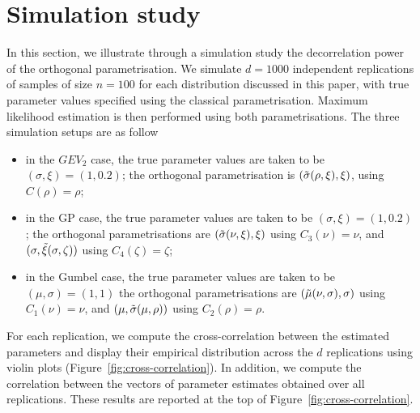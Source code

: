 \documentclass{article}
\newcommand{\1}{\mathds{1}}
\theoremstyle{definition}
\begin{document}
\section{Simulation study}\label{sec:simu}
In this section, we illustrate through a simulation study the decorrelation power of the orthogonal parametrisation. 
We simulate $d = 1000$ independent replications of samples of size $n = 100$ for each distribution discussed in this paper, with true parameter values specified using the classical parametrisation. Maximum likelihood estimation is then performed using both parametrisations. The three simulation setups are as follow

\begin{itemize}
    \item in the $GEV_2$ case, the true parameter values are taken to be $(\sigma,\xi)=(1,0.2)$; the orthogonal parametrisation is $(\Tilde{\sigma}(\rho,\xi),\xi)$, using $C(\rho)=\rho$;
    \item in the GP case, the true parameter values are taken to be $(\sigma,\xi)=(1,0.2)$; the orthogonal parametrisations are $(\Tilde{\sigma}(\nu,\xi),\xi)$ using $C_3(\nu)=\nu$, and $(\sigma,\Tilde{\xi}(\sigma,\zeta))$ using $C_4(\zeta)=\zeta$;
    \item in the Gumbel case, the true parameter values are taken to be $(\mu,\sigma)=(1,1)$ the orthogonal parametrisations are $(\Tilde{\mu}(\nu,\sigma),\sigma)$ using $C_1(\nu)=\nu$, and $(\mu,\Tilde{\sigma}(\mu,\rho))$ using $C_2(\rho)=\rho$.
\end{itemize}
For each replication, we compute the cross-correlation between the estimated parameters and display their empirical distribution across the $d$ replications using violin plots (Figure~\ref{fig:cross-correlation}). In addition, we compute the correlation between the vectors of parameter estimates obtained over all replications. These results are reported at the top of Figure~\ref{fig:cross-correlation}.
\end{document}
